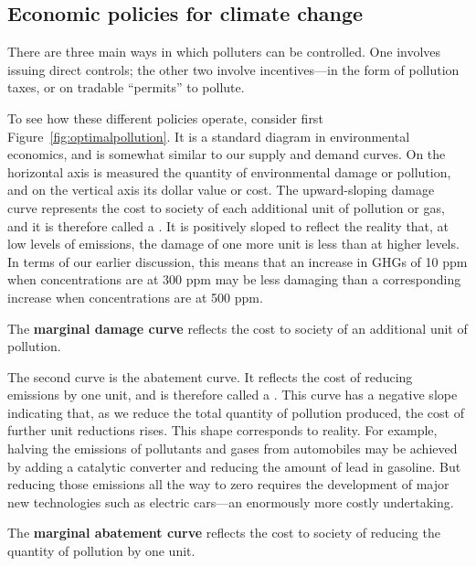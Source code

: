 \newhtmlpage

\subsection*{Economic policies for climate change}

There are three main ways in which polluters can be controlled. One involves
issuing direct controls; the other two involve incentives---in the form of
pollution taxes, or on tradable ``permits'' to pollute.

To see how these different policies operate, consider first Figure~\ref{fig:optimalpollution}.
It is a standard diagram in environmental economics,
and is somewhat similar to our supply and demand curves. On the horizontal
axis is measured the quantity of environmental damage or pollution, and on
the vertical axis its dollar value or cost. The upward-sloping damage curve
represents the cost to society of each additional unit of pollution or gas,
and it is therefore called a . It is
positively sloped to reflect the reality that, at low levels of emissions,
the damage of one more unit is less than at higher levels. In terms of our
earlier discussion, this means that an increase in GHGs of 10 ppm when
concentrations are at 300 ppm may be less damaging than a corresponding
increase when concentrations are at 500 ppm.

\begin{DefBox}
The \textbf{marginal damage curve} reflects the cost to society of an additional unit of pollution.
\end{DefBox}




\newhtmlpage

The second curve is the abatement curve. It reflects the cost of reducing
emissions by one unit, and is therefore called a . This curve has a negative slope indicating that, as we
reduce the total quantity of pollution produced, the cost of further unit
reductions rises. This shape corresponds to reality. For example, halving
the emissions of pollutants and gases from automobiles may be achieved by
adding a catalytic converter and reducing the amount of lead in gasoline.
But reducing those emissions all the way to zero requires the development of
major new technologies such as electric cars---an enormously more costly
undertaking.

\begin{DefBox}
The \textbf{marginal abatement curve} reflects the cost to society of reducing the quantity of pollution by one unit.
\end{DefBox}


